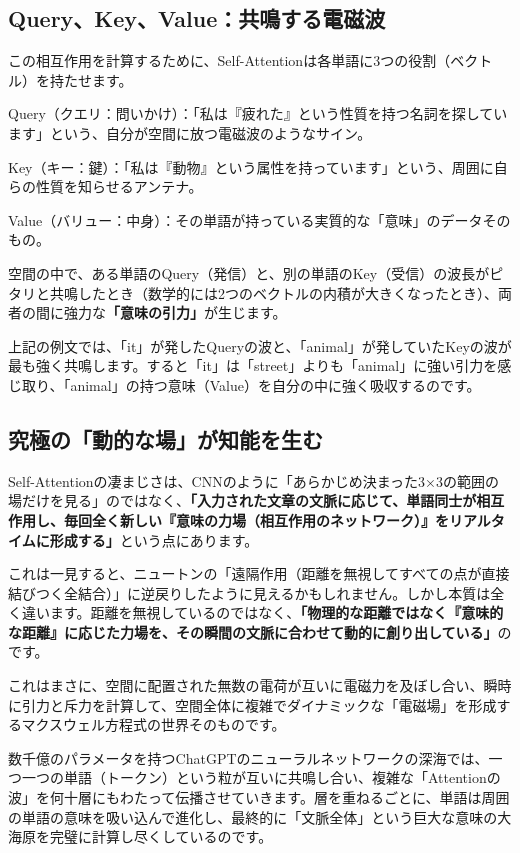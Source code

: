 \subsection{Query、Key、Value：共鳴する電磁波}

この相互作用を計算するために、Self-Attentionは各単語に3つの役割（ベクトル）を持たせます。

Query（クエリ：問いかけ）：「私は『疲れた』という性質を持つ名詞を探しています」という、自分が空間に放つ電磁波のようなサイン。

Key（キー：鍵）：「私は『動物』という属性を持っています」という、周囲に自らの性質を知らせるアンテナ。

Value（バリュー：中身）：その単語が持っている実質的な「意味」のデータそのもの。

空間の中で、ある単語のQuery（発信）と、別の単語のKey（受信）の波長がピタリと共鳴したとき（数学的には2つのベクトルの内積が大きくなったとき）、両者の間に強力な\textbf{「意味の引力」}が生じます。

上記の例文では、「it」が発したQueryの波と、「animal」が発していたKeyの波が最も強く共鳴します。すると「it」は「street」よりも「animal」に強い引力を感じ取り、「animal」の持つ意味（Value）を自分の中に強く吸収するのです。

\subsection{究極の「動的な場」が知能を生む}

Self-Attentionの凄まじさは、CNNのように「あらかじめ決まった3×3の範囲の場だけを見る」のではなく、\textbf{「入力された文章の文脈に応じて、単語同士が相互作用し、毎回全く新しい『意味の力場（相互作用のネットワーク）』をリアルタイムに形成する」}という点にあります。

これは一見すると、ニュートンの「遠隔作用（距離を無視してすべての点が直接結びつく全結合）」に逆戻りしたように見えるかもしれません。しかし本質は全く違います。距離を無視しているのではなく、\textbf{「物理的な距離ではなく『意味的な距離』に応じた力場を、その瞬間の文脈に合わせて動的に創り出している」}のです。

これはまさに、空間に配置された無数の電荷が互いに電磁力を及ぼし合い、瞬時に引力と斥力を計算して、空間全体に複雑でダイナミックな「電磁場」を形成するマクスウェル方程式の世界そのものです。

数千億のパラメータを持つChatGPTのニューラルネットワークの深海では、一つ一つの単語（トークン）という粒が互いに共鳴し合い、複雑な「Attentionの波」を何十層にもわたって伝播させていきます。層を重ねるごとに、単語は周囲の単語の意味を吸い込んで進化し、最終的に「文脈全体」という巨大な意味の大海原を完璧に計算し尽くしているのです。

